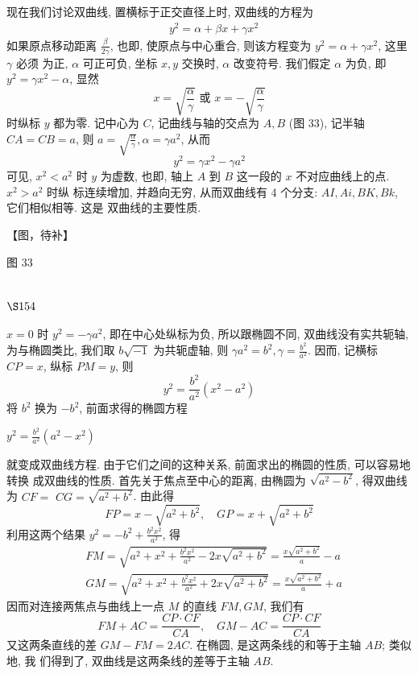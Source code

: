 现在我们讨论双曲线, 置横标于正交直径上时, 双曲线的方程为 
\[
\begin{aligned}
& y^{2}=\alpha+\beta x+\gamma x^{2}
\end{aligned}
\]
如果原点移动距离 $\frac{\beta}{2 \gamma}$, 也即, 使原点与中心重合, 则该方程变为 $y^{2}=\alpha+\gamma x^{2}$, 这里 $\gamma$ 必须 为正, $\alpha$ 可正可负, 坐标 $x, y$ 交换时, $\alpha$ 改变符号. 我们假定 $\alpha$ 为负, 即 $y^{2}=\gamma x^{2}-\alpha$, 显然
\[
x=\sqrt{\frac{\alpha}{\gamma}} \text { 或 } x=-\sqrt{\frac{\alpha}{\gamma}}
\]
时纵标 $y$ 都为零. 记中心为 $C$, 记曲线与轴的交点为 $A, B$ (图 33), 记半轴 $C A=C B=a$, 则 $a=\sqrt{\frac{\alpha}{\gamma}}, \alpha=\gamma a^{2}$, 从而
\[
y^{2}=\gamma x^{2}-\gamma a^{2}
\]
可见, $x^{2}<a^{2}$ 时 $y$ 为虚数, 也即, 轴上 $A$ 到 $B$ 这一段的 $x$ 不对应曲线上的点. $x^{2}>a^{2}$ 时纵 标连续增加, 并趋向无穷, 从而双曲线有 4 个分支: $A I, A i, B K, B k$, 它们相似相等. 这是 双曲线的主要性质.


【图，待补】

图 33

\section{$\S 154$}

$x=0$ 时 $y^{2}=-\gamma a^{2}$, 即在中心处纵标为负, 所以跟椭圆不同, 双曲线没有实共轭轴, 为与椭圆类比, 我们取 $b \sqrt{-1}$ 为共轭虚轴, 则 $\gamma a^{2}=b^{2}, \gamma=\frac{b^{2}}{a^{2}}$. 因而, 记横标 $C P=x$, 纵标 $P M=y$, 则
\[
y^{2}=\frac{b^{2}}{a^{2}}\left(x^{2}-a^{2}\right)
\]
将 $b^{2}$ 换为 $-b^{2}$, 前面求得的椭圆方程 

$y^{2}=\frac{b^{2}}{a^{2}}\left(a^{2}-x^{2}\right)$

就变成双曲线方程. 由于它们之间的这种关系, 前面求出的椭圆的性质, 可以容易地转换 成双曲线的性质. 首先关于焦点至中心的距离, 由椭圆为 $\sqrt{a^{2}-b^{2}}$, 得双曲线为 $C F=$ $C G=\sqrt{a^{2}+b^{2}}$. 由此得
\[
F P=x-\sqrt{a^{2}+b^{2}}, \quad G P=x+\sqrt{a^{2}+b^{2}}
\]
利用这两个结果 $y^{2}=-b^{2}+\frac{b^{2} x^{2}}{a^{2}}$, 得
\[
\begin{aligned}
& F M=\sqrt{a^{2}+x^{2}+\frac{b^{2} x^{2}}{a^{2}}-2 x \sqrt{a^{2}+b^{2}}}=\frac{x \sqrt{a^{2}+b^{2}}}{a}-a \\
& G M=\sqrt{a^{2}+x^{2}+\frac{b^{2} x^{2}}{a^{2}}+2 x \sqrt{a^{2}+b^{2}}}=\frac{x \sqrt{a^{2}+b^{2}}}{a}+a
\end{aligned}
\]
因而对连接两焦点与曲线上一点 $M$ 的直线 $F M, G M$, 我们有
\[
F M+A C=\frac{C P \cdot C F}{C A}, \quad G M-A C=\frac{C P \cdot C F}{C A}
\]
又这两条直线的差 $G M-F M=2 A C$. 在椭圆, 是这两条线的和等于主轴 $A B$; 类似地, 我 们得到了, 双曲线是这两条线的差等于主轴 $A B$.

